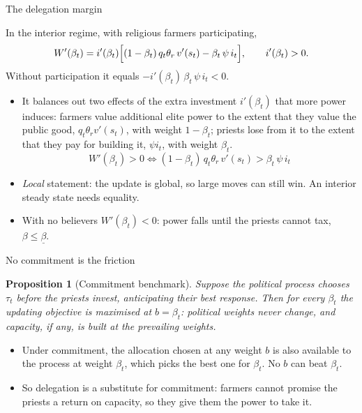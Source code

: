 \documentclass[11pt,aspectratio=169]{beamer}
\newtheorem{proposition}[theorem]{Proposition}
\begin{document}
\begin{frame}{The delegation margin}
\begin{lemma}
In the interior regime, with religious farmers participating,
\[
W'(\beta_t)= i'(\beta_t)\Bigl[(1-\beta_t)\,q_t\theta_r\,v'(s_t)-\beta_t\,\psi\,i_t\Bigr],
\qquad i'(\beta_t)>0 .
\]
Without participation it equals $-i'(\beta_t)\,\beta_t\,\psi\,i_t<0$.
\end{lemma}
\begin{itemize}
\item It balances out two effects of the extra investment $i'(\beta_t)$ that more power induces:
farmers value additional elite power to the extent that they value the public good,
$q_t\theta_rv'(s_t)$, with weight $1-\beta_t$; priests lose from it to the extent that they pay
for building it, $\psi i_t$, with weight $\beta_t$.
\[
\boxed{\ W'(\beta_t)>0\iff(1-\beta_t)\,q_t\theta_r\,v'(s_t)>\beta_t\,\psi\,i_t\ }
\]
\item \emph{Local} statement: the update is global, so large moves can still win. An interior
steady state needs equality.
\item With no believers $W'(\beta_t)<0$: power falls until the priests cannot tax,
$\beta\le\underline\beta$.
\end{itemize}
\end{frame}

\begin{frame}{No commitment is the friction}
\begin{proposition}[Commitment benchmark]
Suppose the political process chooses $\tau_t$ before the priests invest, anticipating their best
response. Then for every $\beta_t$ the updating objective is maximised at $b=\beta_t$: political
weights never change, and capacity, if any, is built at the prevailing weights.
\end{proposition}
\begin{itemize}
\item Under commitment, the allocation chosen at any weight $b$ is also available to the process at
weight $\beta_t$, which picks the best one for $\beta_t$. No $b$ can beat $\beta_t$.
\item So delegation is a \alert{substitute for commitment}: farmers cannot promise the priests a
return on capacity, so they give them the power to take it.
\end{itemize}
\end{frame}
\end{document}
